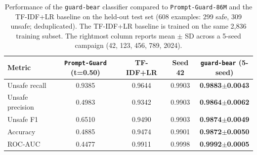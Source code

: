 \documentclass[pdflatex,sn-mathphys-num]{sn-jnl-official}%
\begin{document}
\begin{table}[!h]
  \centering
  \caption{Performance of the \texttt{guard-bear} classifier compared to \texttt{Prompt-Guard-86M} and the TF-IDF+LR baseline on the held-out test set (608 examples: 299 safe, 309 unsafe; deduplicated). The TF-IDF+LR baseline is trained on the same 2{,}836 training subset. The rightmost column reports mean $\pm$ SD across a 5-seed campaign (42, 123, 456, 789, 2024).}
  \label{tab:guardheadline}
  \small
  {\setlength{\tabcolsep}{4pt}%
  \begin{tabular}{@{}lcccc@{}}
    \toprule
    Metric & \texttt{Prompt-Guard} (t=0.50) & TF-IDF+LR & Seed 42 & \texttt{guard-bear} (5-seed) \\
    \midrule
    Unsafe recall    & 0.9385 & 0.9644 & 0.9903 & \textbf{0.9883$\pm$0.0043} \\
    Unsafe precision & 0.4983 & 0.9342 & 0.9903 & \textbf{0.9864$\pm$0.0062} \\
    Unsafe F1        & 0.6510 & 0.9490 & 0.9903 & \textbf{0.9874$\pm$0.0049} \\
    Accuracy         & 0.4885 & 0.9474 & 0.9901 & \textbf{0.9872$\pm$0.0050} \\
    ROC-AUC          & 0.4477 & 0.9911 & 0.9998 & \textbf{0.9992$\pm$0.0005} \\
    \bottomrule
  \end{tabular}}
\end{table}
\end{document}
